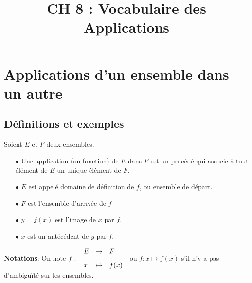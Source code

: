 \documentclass[a4paper, 11pt]{article}
\begin{document}
\tableofcontents

\title{ CH 8 :  Vocabulaire des Applications}


\section{Applications d'un ensemble dans un autre}

\subsection{D\'efinitions et exemples}





\begin{defi} Soient $E$ et $F$ deux ensembles.
	\begin{itemize}
		\item[$\bullet$] Une application (ou fonction) de $E$ dans $F$ est un proc\'ed\'e qui associe à tout élément de $E$ un unique élément de $F$.
		\item[$\bullet$] $E$ est appelé domaine de définition de $f$, ou ensemble de départ.
		\item[$\bullet$] $F$ est  l'ensemble d'arrivée de $f$
		\item[$\bullet$] $y=f(x)$ est l'image de $x$ par $f$.
		\item[$\bullet$] $x$ est  un antécédent de $y$ par $f$.
	\end{itemize}
\end{defi}




\textbf{Notations}: On note $f: \left| \begin{array}{lll}
		E & \rightarrow & F\vsec \\
		x & \mapsto     & f(x)
	\end{array} \right.$ ou $f: x\mapsto f(x)$ s'il n'y a pas d'ambigu\"it\'e sur les ensembles.
\end{document}
